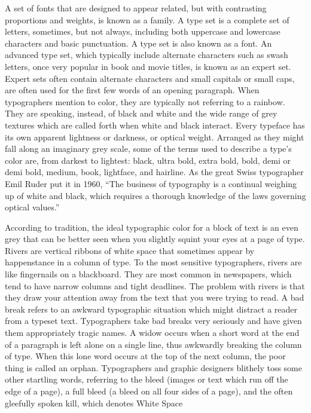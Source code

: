 \documentclass[12pt,a4paper,twocolumn]{book} %
\begin{document}
A set of fonts that are designed to appear related, but with contrasting proportions and weights, is known as a family. A type set is a complete set of letters, sometimes, but not always, including both uppercase and lowercase characters and basic punctuation. A type set is also known as a font. An advanced type set, which typically include alternate characters such as swash letters, once very popular in book and movie titles, is known as an expert set. Expert sets often contain alternate characters and small capitals or small caps, are often used for the first few words of an opening paragraph.
When typographers mention to color, they are typically not referring to a rainbow. They are speaking, instead, of black and white and the wide range of grey textures which are called forth when white and black interact. Every typeface has its own apparent lightness or darkness, or optical weight. Arranged as they might fall along an imaginary grey scale, some of the terms used to describe a type’s color are, from darkest to lightest: black, ultra bold, extra bold, bold, demi or demi bold, medium, book, lightface, and hairline. As the great Swiss typographer Emil Ruder put it in 1960, “The business of typography is a continual weighing up of white and black, which requires a thorough knowledge of the laws governing optical values.”

According to tradition, the ideal typographic color for a block of text is an even grey that can be better seen when you slightly squint your eyes at a page of type. Rivers are vertical ribbons of white space that sometimes appear by happenstance in a column of type. To the most sensitive typographers, rivers are like fingernails on a blackboard. They are most common in newspapers, which tend to have narrow columns and tight deadlines. The problem with rivers is that they draw your attention away from the text that you were trying to read.
A bad break refers to an awkward typographic situation which might distract a reader from a typeset text. Typographers take bad breaks very seriously and have given them appropriately tragic names. A widow occurs when a short word at the end of a paragraph is left alone on a single line, thus awkwardly breaking the column of type. When this lone word occurs at the top of the next column, the poor thing is called an orphan. Typographers and graphic designers blithely toss some other startling words, referring to the bleed (images or text which run off the edge of a page), a full bleed (a bleed on all four sides of a page), and the often gleefully spoken kill, which denotes
White Space
\end{document}
